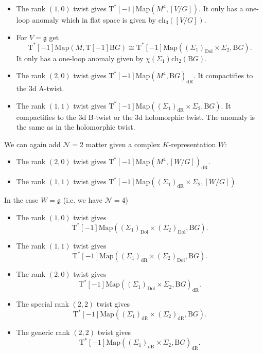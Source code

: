 \documentclass[12pt]{amsart}
\newcommand{\B}{\mathrm{B}}
\newcommand{\g}{\mathfrak{g}}
\newcommand{\cN}{\mathcal{N}}
\newcommand{\T}{\mathrm{T}}
\newcommand{\ch}{\mathrm{ch}}
\newcommand{\Dol}{\mathrm{Dol}}
\newcommand{\dR}{\mathrm{dR}}
\newcommand{\Map}{\mathrm{Map}}
\theoremstyle{definition}
\theoremstyle{remark}
\begin{document}
\begin{itemize}
\item The rank $(1, 0)$ twist gives $\T^*[-1]\Map(M^4, [V/G])$. It only has a one-loop anomaly which in flat space is given by $\ch_3([V/G])$.

\item For $V=\g$ get
\[\T^*[-1]\Map(M, \T[-1]\B G)\cong \T^*[-1]\Map((\Sigma_1)_{\Dol}\times \Sigma_2, \B G).\]
It only has a one-loop anomaly given by $\chi(\Sigma_1) \ch_2(\B G)$.

\item The rank $(2, 0)$ twist gives $\T^*[-1]\Map(M^4, \B G)_{\dR}$. It compactifies to the 3d A-twist.

\item The rank $(1, 1)$ twist gives $\T^*[-1]\Map((\Sigma_1)_{\dR}\times \Sigma_2, \B G)$. It compactifies to the 3d B-twist or the 3d holomorphic twist. The anomaly is the same as in the holomorphic twist.
\end{itemize}

We can again add $\cN=2$ matter given a complex $K$-representation $W$:
\begin{itemize}
\item The rank $(2, 0)$ twist gives $\T^*[-1]\Map(M^4, [W/G])_{\dR}$.

\item The rank $(1, 1)$ twist gives $\T^*[-1]\Map((\Sigma_1)_{\dR}\times \Sigma_2, [W/G])$.
\end{itemize}

In the case $W=\g$ (i.e. we have $\cN=4$)
\begin{itemize}
\item The rank $(1, 0)$ twist gives
\[\T^*[-1]\Map((\Sigma_1)_{\Dol}\times (\Sigma_2)_{\Dol}, \B G).\]

\item The rank $(1, 1)$ twist gives
\[\T^*[-1]\Map((\Sigma_1)_{\dR}\times (\Sigma_2)_{\Dol}, \B G).\]

\item The rank $(2, 0)$ twist gives
\[\T^*[-1]\Map((\Sigma_1)_{\Dol}\times \Sigma_2, \B G)_{\dR}.\]

\item The special rank $(2, 2)$ twist gives
\[\T^*[-1]\Map((\Sigma_1)_{\dR}\times (\Sigma_2)_{\dR}, \B G).\]

\item The generic rank $(2, 2)$ twist gives
\[\T^*[-1]\Map((\Sigma_1)_{\dR}\times \Sigma_2, \B G)_{\dR}.\]
\end{itemize}
\end{document}
